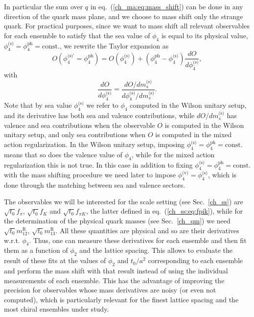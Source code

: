 In particular the sum over $q$ in eq.~(\ref{ch_ma:eq:mass_shift}) can be done in any direction of the quark mass plane, and we choose to mass shift only the strange quark. For practical purposes, since we want to mass shift all relevant observables for each ensemble to satisfy that the sea value of $\phi_4$ is equal to its physical value, $\phi_4^{\textrm{(s)}}=\phi_4^{\textrm{ph}}={\textrm{const.}}$, we rewrite the Taylor expansion as
\begin{equation}
{O}\left(\phi_4^{\textrm{(s)'}}=\phi_4^{\textrm{ph}}\right)={O}\left(\phi_4^{\textrm{(s)}}\right)+\left(\phi_4^{\textrm{ph}}-\phi_4^{\textrm{(s)}}\right)\frac{d{O}}{d\phi_4^{\textrm{(s)}}},
\end{equation}
with
\begin{equation}
\frac{d{O}}{d\phi_4^{\textrm{(s)}}}=\frac{d{O}/dm_s^{\textrm{(s)}}}{d\phi_4^{\textrm{(s)}}/dm_s^{\textrm{(s)}}}.
\end{equation}
Note that by sea value $\phi_4^{\textrm{(s)}}$ we refer to $\phi_4$ computed in the Wilson unitary setup, and its derivative has both sea and valence contributions, while $d{O}/dm_s^{\textrm{(s)}}$ has valence and sea contributions when the observable ${O}$ is computed in the Wilson unitary setup, and only sea contributions when ${O}$ is computed in the mixed action regularization. In the Wilson unitary setup, imposing $\phi_4^{\textrm{(s)}}=\phi_4^{\textrm{ph}}={\textrm{const.}}$ means that so does the valence value of $\phi_4$, while for the mixed action regularization this is not true. In this case in addition to fixing $\phi_4^{\textrm{(s)}}=\phi_4^{\textrm{ph}}={\textrm{const.}}$ with the mass shifting procedure we need later to impose $\phi_4^{\textrm{(v)}}=\phi_4^{\textrm{(s)}}$, which is done through the matching between sea and valence sectors.

The observables we will be interested for the scale setting (see Sec.~\ref{ch_ss}) are $\sqrt{t_0}f_{\pi}$, $\sqrt{t_0}f_{K}$ and $\sqrt{t_0}f_{\pi K}$, the latter defined in eq.~(\ref{ch_ss:eq:fpik}), while for the determination of the physical quark masses (see Sec.~\ref{ch_qm}) we need $\sqrt{t_0}m_{12}^{\textrm{R}}$, $\sqrt{t_0}m_{13}^{\textrm{R}}$. All these quantities are physical and so are their derivatives w.r.t. $\phi_4$. Thus, one can measure these derivatives for each ensemble and then fit them as a function of $\phi_2$ and the lattice spacing. This allows to evaluate the result of these fits at the values of $\phi_2$ and $t_0/a^2$ corresponding to each ensemble and perform the mass shift with that result instead of using the individual measurements of each ensemble. This has the advantage of improving the precision for observables whose mass derivatives are noisy (or even not computed), which is particularly relevant for the finest lattice spacing and the most chiral ensembles under study.

